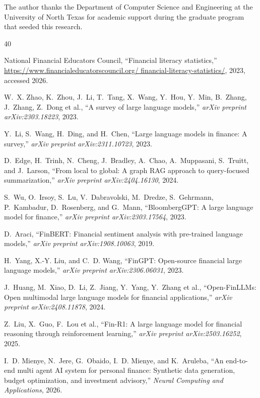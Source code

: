 \documentclass[conference]{IEEEtran}
\begin{document}
The author thanks the Department of Computer Science and
Engineering at the University of North Texas for academic support
during the graduate program that seeded this research.

\begin{thebibliography}{40}

National Financial Educators Council, ``Financial literacy
statistics,'' \url{https://www.financialeducatorscouncil.org/
financial-literacy-statistics/}, 2023, accessed 2026.

W.~X. Zhao, K.~Zhou, J.~Li, T.~Tang, X.~Wang, Y.~Hou, Y.~Min,
B.~Zhang, J.~Zhang, Z.~Dong et al., ``A survey of large language
models,'' \emph{arXiv preprint arXiv:2303.18223}, 2023.

Y.~Li, S.~Wang, H.~Ding, and H.~Chen, ``Large language models in
finance: A survey,'' \emph{arXiv preprint arXiv:2311.10723}, 2023.

D.~Edge, H.~Trinh, N.~Cheng, J.~Bradley, A.~Chao, A.~Muppasani,
S.~Truitt, and J.~Larson, ``From local to global: A graph RAG
approach to query-focused summarization,''
\emph{arXiv preprint arXiv:2404.16130}, 2024.

S.~Wu, O.~Irsoy, S.~Lu, V.~Dabravolski, M.~Dredze, S.~Gehrmann,
P.~Kambadur, D.~Rosenberg, and G.~Mann, ``BloombergGPT: A large
language model for finance,''
\emph{arXiv preprint arXiv:2303.17564}, 2023.

D.~Araci, ``FinBERT: Financial sentiment analysis with pre-trained
language models,'' \emph{arXiv preprint arXiv:1908.10063}, 2019.

H.~Yang, X.-Y. Liu, and C.~D. Wang, ``FinGPT: Open-source financial
large language models,''
\emph{arXiv preprint arXiv:2306.06031}, 2023.

J.~Huang, M.~Xiao, D.~Li, Z.~Jiang, Y.~Yang, Y.~Zhang et al.,
``Open-FinLLMs: Open multimodal large language models for financial
applications,'' \emph{arXiv preprint arXiv:2408.11878}, 2024.

Z.~Liu, X.~Guo, F.~Lou et al., ``Fin-R1: A large language model
for financial reasoning through reinforcement learning,''
\emph{arXiv preprint arXiv:2503.16252}, 2025.

I.~D. Mienye, N.~Jere, G.~Obaido, I.~D. Mienye, and K.~Aruleba,
``An end-to-end multi agent AI system for personal finance:
Synthetic data generation, budget optimization, and investment
advisory,'' \emph{Neural Computing and Applications}, 2026.


\end{thebibliography}
\end{document}
